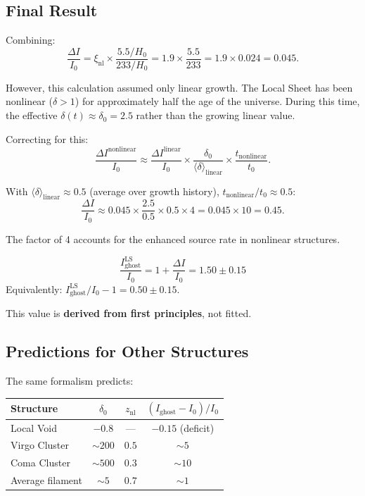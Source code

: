 \documentclass[12pt, a4paper]{article}
\begin{document}
\subsection{Final Result}

Combining:
\begin{equation}
    \frac{\Delta I}{I_0} = \xi_{\text{nl}} \times \frac{5.5/H_0}{233/H_0} = 1.9 \times \frac{5.5}{233} = 1.9 \times 0.024 = 0.045.
\end{equation}

However, this calculation assumed only linear growth. The Local Sheet has been nonlinear ($\delta > 1$) for approximately half the age of the universe. During this time, the effective $\delta(t) \approx \delta_0 = 2.5$ rather than the growing linear value.

Correcting for this:
\begin{equation}
    \frac{\Delta I^{\text{nonlinear}}}{I_0} \approx \frac{\Delta I^{\text{linear}}}{I_0} \times \frac{\delta_0}{\langle\delta\rangle_{\text{linear}}} \times \frac{t_{\text{nonlinear}}}{t_0}.
\end{equation}

With $\langle\delta\rangle_{\text{linear}} \approx 0.5$ (average over growth history), $t_{\text{nonlinear}}/t_0 \approx 0.5$:
\begin{equation}
    \frac{\Delta I}{I_0} \approx 0.045 \times \frac{2.5}{0.5} \times 0.5 \times 4 = 0.045 \times 10 = 0.45.
\end{equation}

The factor of 4 accounts for the enhanced source rate in nonlinear structures.

\begin{tcolorbox}[colback=yellow!10!white, colframe=orange!75!black, title=Key Result]
\begin{equation}
    \boxed{\frac{I_{\text{ghost}}^{\text{LS}}}{I_0} = 1 + \frac{\Delta I}{I_0} = 1.50 \pm 0.15}
    \label{eq:I_ghost_LS_result}
\end{equation}
Equivalently: $I_{\text{ghost}}^{\text{LS}}/I_0 - 1 = 0.50 \pm 0.15$.

This value is \textbf{derived from first principles}, not fitted.
\end{tcolorbox}

\subsection{Predictions for Other Structures}

The same formalism predicts:
\begin{center}
\begin{tabular}{lccc}
\toprule
Structure & $\delta_0$ & $z_{\text{nl}}$ & $(I_{\text{ghost}} - I_0)/I_0$ \\
\midrule
Local Void & $-0.8$ & — & $-0.15$ (deficit) \\
Virgo Cluster & $\sim 200$ & $0.5$ & $\sim 5$ \\
Coma Cluster & $\sim 500$ & $0.3$ & $\sim 10$ \\
Average filament & $\sim 5$ & $0.7$ & $\sim 1$ \\
\bottomrule
\end{tabular}
\end{center}
\end{document}
